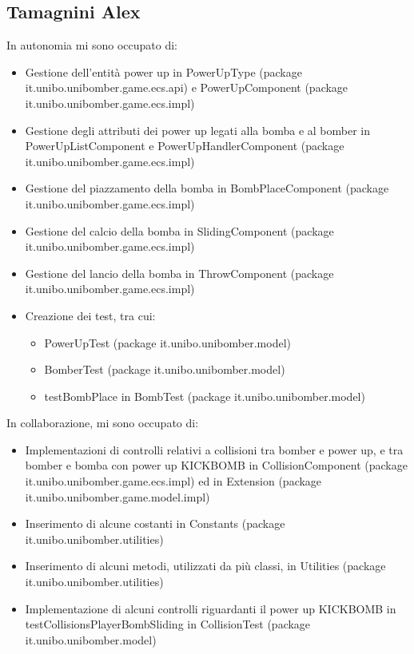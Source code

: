 \documentclass[a4paper,12pt]{report}
\begin{document}
\subsection*{Tamagnini Alex}
In autonomia mi sono occupato di:
\begin{itemize}
    \item Gestione dell’entità power up in PowerUpType (package it.unibo.unibomber.game.ecs.api) e PowerUpComponent (package it.unibo.unibomber.game.ecs.impl)
    \item Gestione degli attributi dei power up legati alla bomba e al bomber in PowerUpListComponent e PowerUpHandlerComponent (package it.unibo.unibomber.game.ecs.impl)
    \item Gestione del piazzamento della bomba in BombPlaceComponent (package it.unibo.unibomber.game.ecs.impl)
    \item Gestione del calcio della bomba in SlidingComponent
          (package it.unibo.unibomber.game.ecs.impl)
    \item Gestione del lancio della bomba in ThrowComponent (package it.unibo.unibomber.game.ecs.impl)
    \item Creazione dei test, tra cui:
          \begin{itemize}
              \item PowerUpTest (package it.unibo.unibomber.model)
              \item BomberTest (package it.unibo.unibomber.model)
              \item testBombPlace in BombTest (package it.unibo.unibomber.model)
          \end{itemize}
\end{itemize}
In collaborazione, mi sono occupato di:
\begin{itemize}
    \item Implementazioni di controlli relativi a collisioni tra bomber e power up, e tra bomber e bomba con power up KICKBOMB in CollisionComponent (package it.unibo.unibomber.game.ecs.impl) ed in Extension (package it.unibo.unibomber.game.model.impl)
    \item Inserimento di alcune costanti in Constants (package it.unibo.unibomber.utilities)
    \item Inserimento di alcuni metodi, utilizzati da più classi, in Utilities (package it.unibo.unibomber.utilities)
    \item Implementazione di alcuni controlli riguardanti il power up KICKBOMB in testCollisionsPlayerBombSliding in CollisionTest (package it.unibo.unibomber.model)
\end{itemize}
\end{document}
